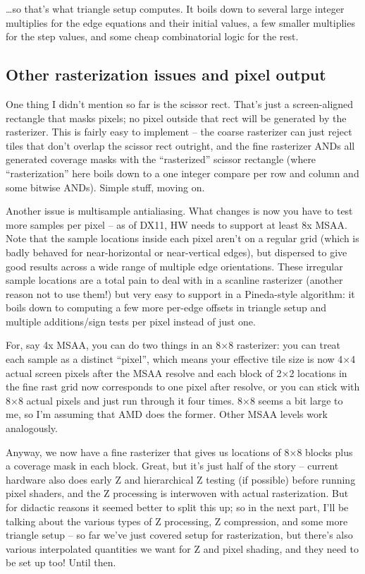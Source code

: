\documentclass[12pt]{article}
\begin{document}
…so that’s what triangle setup computes. It boils down to several large integer multiplies for the edge equations and their initial values, a few smaller multiplies for the step values, and some cheap combinatorial logic for the rest.

\subsection{Other rasterization issues and pixel output}
\label{sec:org7e402d5}

One thing I didn’t mention so far is the scissor rect. That’s just a screen-aligned rectangle that masks pixels; no pixel outside that rect will be generated by the rasterizer. This is fairly easy to implement – the coarse rasterizer can just reject tiles that don’t overlap the scissor rect outright, and the fine rasterizer ANDs all generated coverage masks with the “rasterized” scissor rectangle (where “rasterization” here boils down to a one integer compare per row and column and some bitwise ANDs). Simple stuff, moving on.

Another issue is multisample antialiasing. What changes is now you have to test more samples per pixel – as of DX11, HW needs to support at least 8x MSAA. Note that the sample locations inside each pixel aren’t on a regular grid (which is badly behaved for near-horizontal or near-vertical edges), but dispersed to give good results across a wide range of multiple edge orientations. These irregular sample locations are a total pain to deal with in a scanline rasterizer (another reason not to use them!) but very easy to support in a Pineda-style algorithm: it boils down to computing a few more per-edge offsets in triangle setup and multiple additions/sign tests per pixel instead of just one.

For, say 4x MSAA, you can do two things in an 8×8 rasterizer: you can treat each sample as a distinct “pixel”, which means your effective tile size is now 4×4 actual screen pixels after the MSAA resolve and each block of 2×2 locations in the fine rast grid now corresponds to one pixel after resolve, or you can stick with 8×8 actual pixels and just run through it four times. 8×8 seems a bit large to me, so I’m assuming that AMD does the former. Other MSAA levels work analogously.

Anyway, we now have a fine rasterizer that gives us locations of 8×8 blocks plus a coverage mask in each block. Great, but it’s just half of the story – current hardware also does early Z and hierarchical Z testing (if possible) before running pixel shaders, and the Z processing is interwoven with actual rasterization. But for didactic reasons it seemed better to split this up; so in the next part, I’ll be talking about the various types of Z processing, Z compression, and some more triangle setup – so far we’ve just covered setup for rasterization, but there’s also various interpolated quantities we want for Z and pixel shading, and they need to be set up too! Until then.
\end{document}
